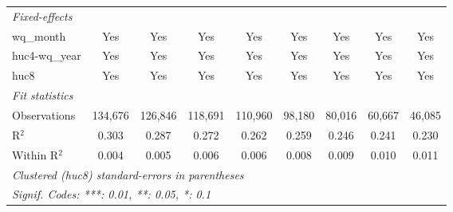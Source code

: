 \begin{tabular}{lcccccccc}
   \midrule
   \emph{Fixed-effects}\\
   wq\_month                     & Yes                            & Yes                            & Yes                            & Yes                            & Yes                            & Yes                            & Yes                            & Yes\\  
   huc4-wq\_year                 & Yes                            & Yes                            & Yes                            & Yes                            & Yes                            & Yes                            & Yes                            & Yes\\  
   huc8                          & Yes                            & Yes                            & Yes                            & Yes                            & Yes                            & Yes                            & Yes                            & Yes\\  
   \midrule
   \emph{Fit statistics}\\
   Observations                  & 134,676                        & 126,846                        & 118,691                        & 110,960                        & 98,180                         & 80,016                         & 60,667                         & 46,085\\  
   R$^2$                         & 0.303                          & 0.287                          & 0.272                          & 0.262                          & 0.259                          & 0.246                          & 0.241                          & 0.230\\  
   Within R$^2$                  & 0.004                          & 0.005                          & 0.006                          & 0.006                          & 0.008                          & 0.009                          & 0.010                          & 0.011\\  
   \midrule \midrule
   \multicolumn{9}{l}{\emph{Clustered (huc8) standard-errors in parentheses}}\\
   \multicolumn{9}{l}{\emph{Signif. Codes: ***: 0.01, **: 0.05, *: 0.1}}\\
\end{tabular}
\par\endgroup


